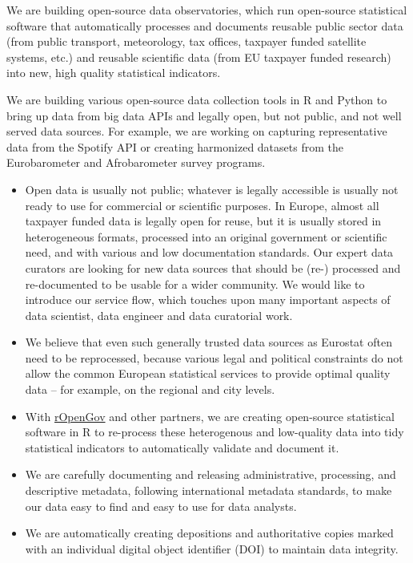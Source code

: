 \documentclass[
  a4paper,
  openany, a4paper, oneside]{book}
\providecommand{\tightlist}{%
  \setlength{\itemsep}{0pt}\setlength{\parskip}{0pt}}
\begin{document}
We are building open-source data observatories, which run open-source statistical software that automatically processes and documents reusable public sector data (from public transport, meteorology, tax offices, taxpayer funded satellite systems, etc.) and reusable scientific data (from EU taxpayer funded research) into new, high quality statistical indicators.

We are building various open-source data collection tools in R and Python to bring up data from big data APIs and legally open, but not public, and not well served data sources. For example, we are working on capturing representative data from the Spotify API or creating harmonized datasets from the Eurobarometer and Afrobarometer survey programs.

\begin{itemize}
\tightlist
\item
  Open data is usually not public; whatever is legally accessible is usually not ready to use for commercial or scientific purposes. In Europe, almost all taxpayer funded data is legally open for reuse, but it is usually stored in heterogeneous formats, processed into an original government or scientific need, and with various and low documentation standards. Our expert data curators are looking for new data sources that should be (re-) processed and re-documented to be usable for a wider community. We would like to introduce our service flow, which touches upon many important aspects of data scientist, data engineer and data curatorial work.
\item
  We believe that even such generally trusted data sources as Eurostat often need to be reprocessed, because various legal and political constraints do not allow the common European statistical services to provide optimal quality data -- for example, on the regional and city levels.
\item
  With \href{/authors/ropengov/}{rOpenGov} and other partners, we are creating open-source statistical software in R to re-process these heterogenous and low-quality data into tidy statistical indicators to automatically validate and document it.
\item
  We are carefully documenting and releasing administrative, processing, and descriptive metadata, following international metadata standards, to make our data easy to find and easy to use for data analysts.
\item
  We are automatically creating depositions and authoritative copies marked with an individual digital object identifier (DOI) to maintain data integrity.

\end{itemize}
\end{document}
